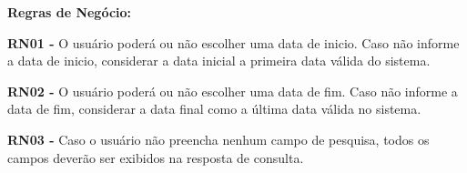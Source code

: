 \begin{quadro}[H]
\begin{framed}
\begin{flushleft}
    \textbf{Regras de Negócio:}
		\item[] \textbf{RN01 - } O usuário poderá ou não escolher uma data de inicio. Caso não informe a data de inicio, considerar a data inicial a primeira data válida do sistema.
		\item[] \textbf{RN02 - } O usuário poderá ou não escolher uma data de fim. Caso não informe a data de fim, considerar a data final como a última data válida no sistema.
		\item[] \textbf{RN03 - } Caso o usuário não preencha nenhum campo de pesquisa, todos os campos deverão ser exibidos na resposta de consulta.
		\end{flushleft}

	\end{framed}

\end {quadro} %


